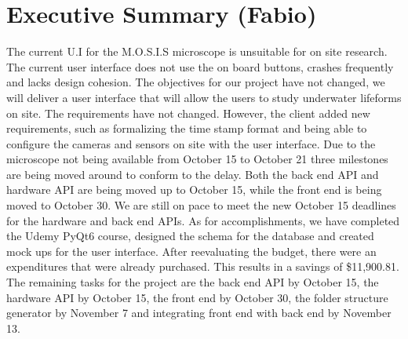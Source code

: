 \section*{Executive Summary (Fabio)}
\begin{spacing}{1.5}

The current U.I for the M.O.S.I.S microscope is unsuitable for on site research. The current user interface does not use the on board buttons, crashes frequently and lacks design cohesion. The objectives for our project have not changed, we will deliver a user interface that will allow the users to study underwater lifeforms on site. The requirements have not changed. However, the client added new requirements, such as formalizing the time stamp format and being able to configure the cameras and sensors on site with the user interface. Due to the microscope not being available from October 15 to October 21  three milestones are being moved around to conform to the delay. Both the back end API and hardware API are being moved up to October 15, while the front end is being moved to October 30. We are still on pace to meet the new October 15 deadlines for the hardware and back end APIs. As for accomplishments, we have completed the Udemy PyQt6 course, designed the schema for the database and created mock ups for the user interface. After reevaluating the budget, there were an expenditures that were already purchased. This results in a savings of \$11,900.81. The remaining tasks for the project are the back end API by October 15, the hardware API by October 15, the front end by October 30, the folder structure generator by November 7 and integrating front end with back end by November 13.
    
\end{spacing}